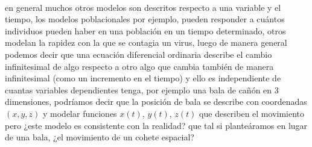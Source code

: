 \documentclass{article}
\begin{document}
\paragraph{}en general muchos otros modelos son descritos respecto a una variable y el tiempo, los modelos poblacionales por ejemplo, pueden responder a cuántos individuos pueden haber en una población en un tiempo determinado, otros modelan la rapidez con la que se contagia un virus, luego de manera general podemos decir que una ecuación diferencial ordinaria describe el cambio infinitesimal de algo respecto a otro algo que cambia también de manera infinitesimal (como un incremento en el tiempo) y ello es independiente de cuantas variables dependientes tenga, por ejemplo una bala de cañón en 3 dimensiones, podríamos decir que la posición de bala se describe con coordenadas $(x,y,z)$ y modelar funciones $x(t)$, $y(t)$, $z(t)$ que describen el movimiento pero ¿este modelo es consistente con la realidad? que tal si planteáramos en lugar de una bala, ¿el movimiento de un cohete espacial?
\end{document}
